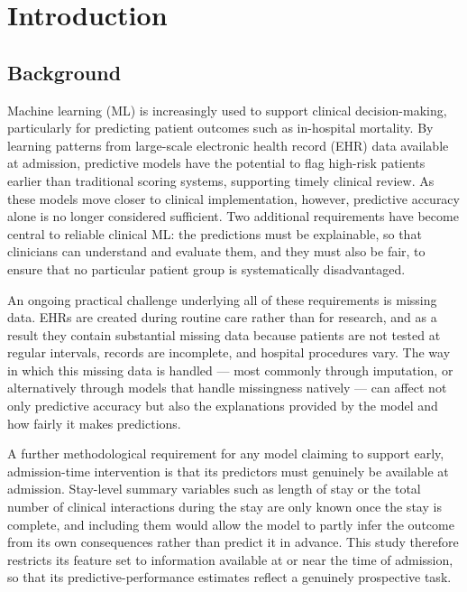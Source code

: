 \documentclass[12pt,a4paper]{report}
\begin{document}
\chapter{Introduction}

\section{Background}
Machine learning (ML) is increasingly used to support clinical decision-making, particularly for predicting patient outcomes such as in-hospital mortality. By learning patterns from large-scale electronic health record (EHR) data available at admission, predictive models have the potential to flag high-risk patients earlier than traditional scoring systems, supporting timely clinical review. As these models move closer to clinical implementation, however, predictive accuracy alone is no longer considered sufficient. Two additional requirements have become central to reliable clinical ML: the predictions must be explainable, so that clinicians can understand and evaluate them, and they must also be fair, to ensure that no particular patient group is systematically disadvantaged.

An ongoing practical challenge underlying all of these requirements is missing data. EHRs are created during routine care rather than for research, and as a result they contain substantial missing data because patients are not tested at regular intervals, records are incomplete, and hospital procedures vary. The way in which this missing data is handled --- most commonly through imputation, or alternatively through models that handle missingness natively --- can affect not only predictive accuracy but also the explanations provided by the model and how fairly it makes predictions.

A further methodological requirement for any model claiming to support early, admission-time intervention is that its predictors must genuinely be available at admission. Stay-level summary variables such as length of stay or the total number of clinical interactions during the stay are only known once the stay is complete, and including them would allow the model to partly infer the outcome from its own consequences rather than predict it in advance. This study therefore restricts its feature set to information available at or near the time of admission, so that its predictive-performance estimates reflect a genuinely prospective task.
\end{document}
